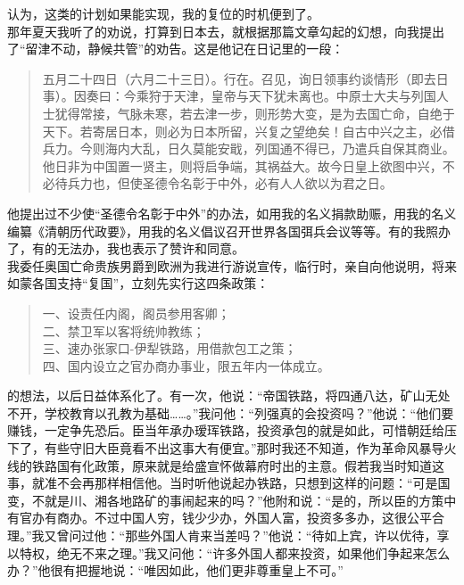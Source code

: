 认为，这类的计划如果能实现，我的复位的时机便到了。\\

那年夏天我听了的劝说，打算到日本去，就根据那篇文章勾起的幻想，向我提出了“留津不动，静候共管”的劝告。这是他记在日记里的一段：\\

\begin{quote}
	五月二十四日（六月二十三日）。行在。召见，询日领事约谈情形（即去日事）。因奏曰：今乘狩于天津，皇帝与天下犹未离也。中原士大夫与列国人士犹得常接，气脉未寒，若去津一步，则形势大变，是为去国亡命，自绝于天下。若寄居日本，则必为日本所留，兴复之望绝矣！自古中兴之主，必借兵力。今则海内大乱，日久莫能安戢，列国通不得已，乃遣兵自保其商业。他日非为中国置一贤主，则将启争端，其祸益大。故今日皇上欲图中兴，不必待兵力也，但使圣德令名彰于中外，必有人人欲以为君之日。\\
\end{quote}

他提出过不少使“圣德令名彰于中外”的办法，如用我的名义捐款助赈，用我的名义编纂《清朝历代政要》，用我的名义倡议召开世界各国弭兵会议等等。有的我照办了，有的无法办，我也表示了赞许和同意。\\

我委任奥国亡命贵族男爵到欧洲为我进行游说宣传，临行时，亲自向他说明，将来如蒙各国支持“复国”，立刻先实行这四条政策：\\

\begin{quote}
一、设责任内阁，阁员参用客卿；\\

二、禁卫军以客将统帅教练；\\

三、速办张家口-伊犁铁路，用借款包工之策；\\

四、国内设立之官办商办事业，限五年内一体成立。\\
\end{quote}

的想法，以后日益体系化了。有一次，他说：“帝国铁路，将四通八达，矿山无处不开，学校教育以孔教为基础……。”我问他：“列强真的会投资吗？”他说：“他们要赚钱，一定争先恐后。臣当年承办瑷珲铁路，投资承包的就是如此，可惜朝廷给压下了，有些守旧大臣竟看不出这事大有便宜。”那时我还不知道，作为革命风暴导火线的铁路国有化政策，原来就是给盛宣怀做幕府时出的主意。假若我当时知道这事，就准不会再那样相信他。当时听他说起办铁路，只想到这样的问题：“可是国变，不就是川、湘各地路矿的事闹起来的吗？”他附和说：“是的，所以臣的方策中有官办有商办。不过中国人穷，钱少少办，外国人富，投资多多办，这很公平合理。”我又曾问过他：“那些外国人肯来当差吗？”他说：“待如上宾，许以优待，享以特权，绝无不来之理。”我又问他：“许多外国人都来投资，如果他们争起来怎么办？”他很有把握地说：“唯因如此，他们更非尊重皇上不可。”\\

